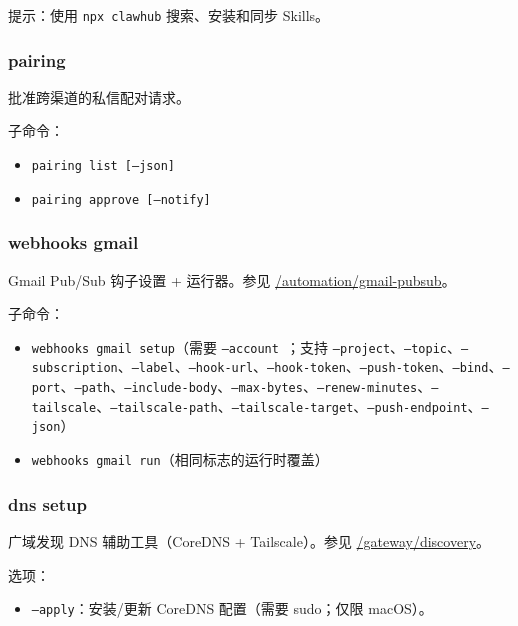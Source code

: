 提示：使用 \texttt{npx clawhub} 搜索、安装和同步 Skills。

\subsubsection{pairing}


批准跨渠道的私信配对请求。

子命令：

\begin{itemize}
  \item \texttt{pairing list  [--json]}
  \item \texttt{pairing approve   [--notify]}
\end{itemize}


\subsubsection{webhooks gmail}


Gmail Pub/Sub 钩子设置 + 运行器。参见 \href{/automation/gmail-pubsub}{/automation/gmail-pubsub}。

子命令：

\begin{itemize}
  \item \texttt{webhooks gmail setup}（需要 \texttt{--account }；支持 \texttt{--project}、\texttt{--topic}、\texttt{--subscription}、\texttt{--label}、\texttt{--hook-url}、\texttt{--hook-token}、\texttt{--push-token}、\texttt{--bind}、\texttt{--port}、\texttt{--path}、\texttt{--include-body}、\texttt{--max-bytes}、\texttt{--renew-minutes}、\texttt{--tailscale}、\texttt{--tailscale-path}、\texttt{--tailscale-target}、\texttt{--push-endpoint}、\texttt{--json}）
  \item \texttt{webhooks gmail run}（相同标志的运行时覆盖）
\end{itemize}


\subsubsection{dns setup}


广域发现 DNS 辅助工具（CoreDNS + Tailscale）。参见 \href{/gateway/discovery}{/gateway/discovery}。

选项：

\begin{itemize}
  \item \texttt{--apply}：安装/更新 CoreDNS 配置（需要 sudo；仅限 macOS）。
\end{itemize}


